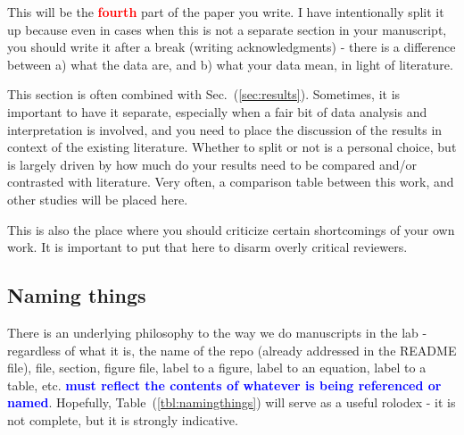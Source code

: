 \documentclass[12 pt]{article}
\begin{document}
This will be the \textbf{\Huge \textcolor{red}{fourth}} part of the paper you write. I have intentionally split it up because even in cases when this is not a separate section in your manuscript, you should write it after a break (writing acknowledgments) - there is a difference between a) what the data are, and b) what your data mean, in light of literature.

This section is often combined with Sec.~(\ref{sec:results}). Sometimes, it is important to have it separate, especially when a fair bit of data analysis and interpretation is involved, and you need to place the discussion of the results in context of the existing literature. Whether to split or not is a personal choice, but is largely driven by how much do your results need to be compared and/or contrasted with literature. Very often, a comparison table between this work, and other studies will be placed here.

This is also the place where you should criticize certain shortcomings of your own work. It is important to put that here to disarm overly critical reviewers.


\subsection{Naming things}

There is an underlying philosophy to the way we do manuscripts in the lab - regardless of what it is, the name of the repo (already addressed in the README file), file, section, figure file, label to a figure, label to an equation, label to a table, etc. \textbf{\Huge \textcolor{blue}{must reflect the contents of whatever is being referenced or named}}. Hopefully, Table~(\ref{tbl:namingthings}) will serve as a useful rolodex - it is not complete, but it is strongly indicative.
\end{document}
